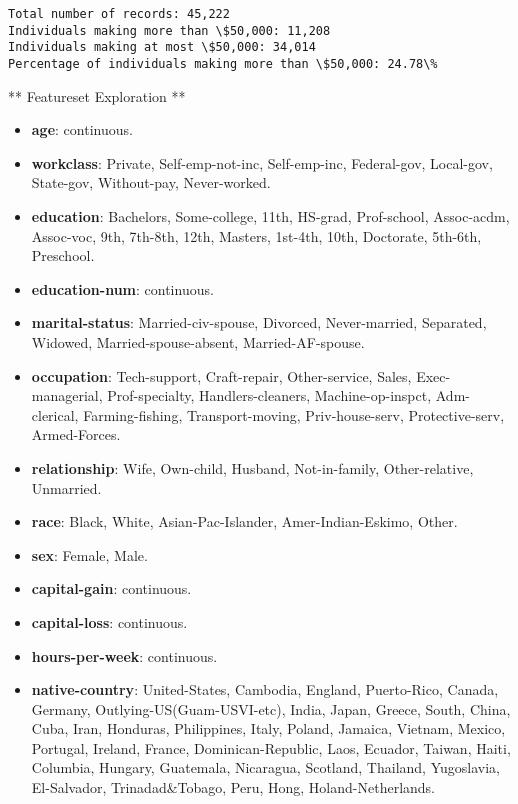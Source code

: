 \documentclass[11pt]{article}
\providecommand{\tightlist}{%
      \setlength{\itemsep}{0pt}\setlength{\parskip}{0pt}}
\begin{document}
    \begin{Verbatim}[commandchars=\\\{\}]
Total number of records: 45,222
Individuals making more than \$50,000: 11,208
Individuals making at most \$50,000: 34,014
Percentage of individuals making more than \$50,000: 24.78\%

    \end{Verbatim}

    ** Featureset Exploration **

\begin{itemize}
\tightlist
\item
  \textbf{age}: continuous.
\item
  \textbf{workclass}: Private, Self-emp-not-inc, Self-emp-inc,
  Federal-gov, Local-gov, State-gov, Without-pay, Never-worked.
\item
  \textbf{education}: Bachelors, Some-college, 11th, HS-grad,
  Prof-school, Assoc-acdm, Assoc-voc, 9th, 7th-8th, 12th, Masters,
  1st-4th, 10th, Doctorate, 5th-6th, Preschool.
\item
  \textbf{education-num}: continuous.
\item
  \textbf{marital-status}: Married-civ-spouse, Divorced, Never-married,
  Separated, Widowed, Married-spouse-absent, Married-AF-spouse.
\item
  \textbf{occupation}: Tech-support, Craft-repair, Other-service, Sales,
  Exec-managerial, Prof-specialty, Handlers-cleaners, Machine-op-inspct,
  Adm-clerical, Farming-fishing, Transport-moving, Priv-house-serv,
  Protective-serv, Armed-Forces.
\item
  \textbf{relationship}: Wife, Own-child, Husband, Not-in-family,
  Other-relative, Unmarried.
\item
  \textbf{race}: Black, White, Asian-Pac-Islander, Amer-Indian-Eskimo,
  Other.
\item
  \textbf{sex}: Female, Male.
\item
  \textbf{capital-gain}: continuous.
\item
  \textbf{capital-loss}: continuous.
\item
  \textbf{hours-per-week}: continuous.
\item
  \textbf{native-country}: United-States, Cambodia, England,
  Puerto-Rico, Canada, Germany, Outlying-US(Guam-USVI-etc), India,
  Japan, Greece, South, China, Cuba, Iran, Honduras, Philippines, Italy,
  Poland, Jamaica, Vietnam, Mexico, Portugal, Ireland, France,
  Dominican-Republic, Laos, Ecuador, Taiwan, Haiti, Columbia, Hungary,
  Guatemala, Nicaragua, Scotland, Thailand, Yugoslavia, El-Salvador,
  Trinadad\&Tobago, Peru, Hong, Holand-Netherlands.
\end{itemize}
\end{document}

